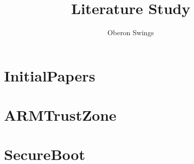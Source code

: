 \documentclass{report}
\title{Literature Study}
\author{Oberon Swings}
\begin{document}
\begin{titlepage}
\maketitle
\thispagestyle{empty}
\end{titlepage}

\tableofcontents
\newpage
{}

\chapter{InitialPapers}















\chapter{ARMTrustZone}





\chapter{SecureBoot}




\end{document}
